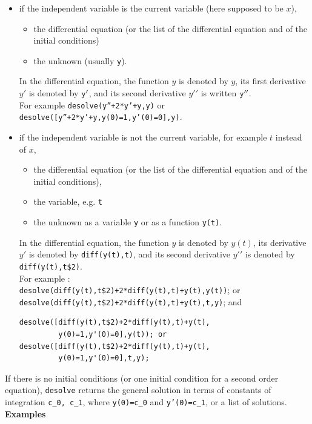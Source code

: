 \documentclass[a4paper,11pt]{book}
\begin{document}
\begin{itemize}
\item  if the independent variable is the current variable (here supposed
to be $x$), 
\begin{itemize}
\item the differential equation (or the list of
the differential equation and of the initial conditions) 
\item the unknown (usually {\tt y}).
\end{itemize}
In the differential equation, the function $y$ is denoted by $y$, 
its first derivative $y \prime$  is denoted by 
${\tt y'}$, and its second derivative $y'{'}$ is written 
${\tt y''}$.\\
For example {\tt desolve(y''+2*y'+y,y)} or \\
{\tt desolve([y''+2*y'+y,y(0)=1,y'(0)=0],y)}.
\item if the independent variable is not the current variable, 
for example $t$ instead of $x$, 
\begin{itemize}
\item the differential equation (or the list of
the differential equation and of the initial conditions), 
\item the variable, e.g. {\tt t} 
\item the unknown as a variable {\tt y} or as a function {\tt y(t)}.
\end{itemize}
In the differential equation, the function $y$ is denoted by $y(t)$,
its derivative $y \prime$  is denoted by
{\tt diff(y(t),t)}, and its second derivative
$y'{'}$  is denoted by {\tt diff(y(t),t\$2)}.\\ 
For example : \\
{\tt desolve(diff(y(t),t\$2)+2*diff(y(t),t)+y(t),y(t))}; or\\
{\tt desolve(diff(y(t),t\$2)+2*diff(y(t),t)+y(t),t,y)};
and \\
\begin{verbatim}
desolve([diff(y(t),t$2)+2*diff(y(t),t)+y(t),
         y(0)=1,y'(0)=0],y(t)); or
desolve([diff(y(t),t$2)+2*diff(y(t),t)+y(t), 
         y(0)=1,y'(0)=0],t,y);
\end{verbatim}
\end{itemize}
If there is no initial conditions (or one initial condition for a second
order equation),
{\tt desolve} returns the general solution in terms of 
constants of integration 
{\tt c\_0, c\_1}, where {\tt y(0)=c\_0} and {\tt y'(0)=c\_1},
or a list of  solutions.\\
{\bf Examples}
\end{document}
